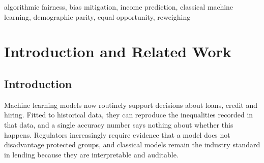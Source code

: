 \documentclass[conference]{IEEEtran}
\begin{document}
\begin{abstract}
Classifiers used to support income and credit decisions are usually judged by aggregate accuracy, which can hide systematic differences in how demographic groups are treated. We audit four classical machine learning models---logistic regression, linear SVM, random forest and gradient boosting---on the UCI Adult census income dataset (48{,}790 records after cleaning) and measure group fairness with respect to sex, race and age group using the demographic parity (DP), equal opportunity (EO), false positive rate and predictive parity gaps, plus an intersectional sex$\times$race audit. Every gap is validated with bootstrap confidence intervals and $z$/$\chi^2$ tests. All four models are significantly biased: the strongest model (gradient boosting, 87.0\% accuracy, F1 0.707) predicts a high income for 26.4\% of men but only 8.3\% of women (DP gap 0.181, 95\% CI [0.168, 0.194], $p<10^{-10}$). Removing sex and race from the inputs (``fairness through unawareness'') leaves the sex gap practically unchanged (0.171), showing that proxy features carry the bias. Five mitigation methods spanning pre-, in- and post-processing are compared: reweighing cuts the DP gap to 0.101 for 0.6 accuracy points, the disparate impact remover barely helps, exponentiated-gradient in-processing can drive the DP gap to 0.023 but at 2.4 accuracy points and a large EO cost, group-specific thresholds remove the EO gap (0.075$\rightarrow$0.002) for 0.2 points, and equalized-odds post-processing equalizes TPR and FPR together for 1.6 points. Training and validation loss curves confirm convergence. The results reproduce the accuracy--fairness trade-off and the incompatibility of fairness criteria: no method improves every gap at once.
\end{abstract}

\begin{IEEEkeywords}
algorithmic fairness, bias mitigation, income prediction, classical machine learning, demographic parity, equal opportunity, reweighing
\end{IEEEkeywords}

\section{Introduction and Related Work}
\subsection{Introduction}
Machine learning models now routinely support decisions about loans, credit and hiring. Fitted to historical data, they can reproduce the inequalities recorded in that data, and a single accuracy number says nothing about whether this happens. Regulators increasingly require evidence that a model does not disadvantage protected groups, and classical models remain the industry standard in lending because they are interpretable and auditable.
\end{document}
